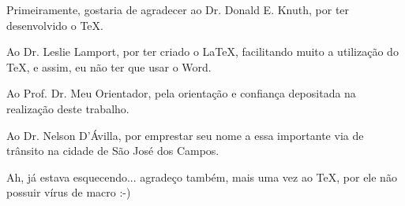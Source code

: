 Primeiramente, gostaria de agradecer ao Dr. Donald E. Knuth, por ter desenvolvido o \TeX.

Ao Dr. Leslie Lamport, por ter criado o \LaTeX, facilitando muito a utilização do \TeX, e assim, eu não ter que usar o Word.

Ao Prof. Dr. Meu Orientador, pela orientação e confiança depositada na realização deste trabalho.

Ao Dr. Nelson D'Ávilla, por emprestar seu nome a essa importante via de trânsito na cidade de São José dos Campos.

Ah, já estava esquecendo... agradeço também, mais uma vez ao \TeX, por ele não possuir vírus de macro :-)
